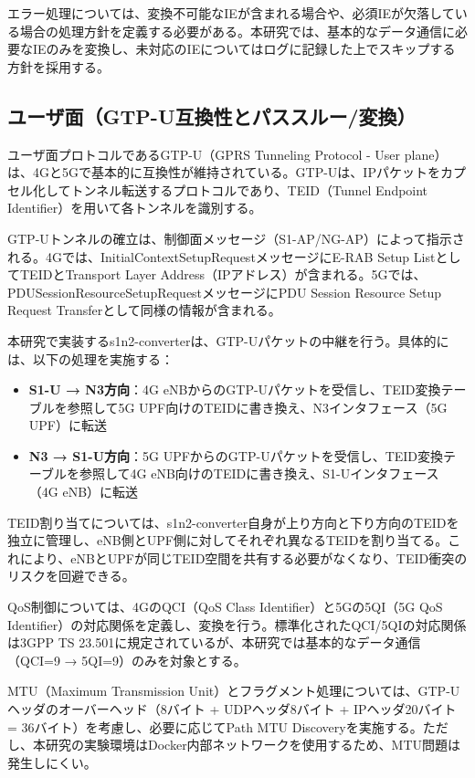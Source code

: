 エラー処理については、変換不可能なIEが含まれる場合や、必須IEが欠落している場合の処理方針を定義する必要がある。本研究では、基本的なデータ通信に必要なIEのみを変換し、未対応のIEについてはログに記録した上でスキップする方針を採用する。

\subsection{ユーザ面（GTP-U互換性とパススルー/変換）}

ユーザ面プロトコルであるGTP-U（GPRS Tunneling Protocol - User plane）は、4Gと5Gで基本的に互換性が維持されている。GTP-Uは、IPパケットをカプセル化してトンネル転送するプロトコルであり、TEID（Tunnel Endpoint Identifier）を用いて各トンネルを識別する。

GTP-Uトンネルの確立は、制御面メッセージ（S1-AP/NG-AP）によって指示される。4Gでは、InitialContextSetupRequestメッセージにE-RAB Setup ListとしてTEIDとTransport Layer Address（IPアドレス）が含まれる。5Gでは、PDUSessionResourceSetupRequestメッセージにPDU Session Resource Setup Request Transferとして同様の情報が含まれる。

本研究で実装するs1n2-converterは、GTP-Uパケットの中継を行う。具体的には、以下の処理を実施する：

\begin{itemize}
\item \textbf{S1-U → N3方向}：4G eNBからのGTP-Uパケットを受信し、TEID変換テーブルを参照して5G UPF向けのTEIDに書き換え、N3インタフェース（5G UPF）に転送
\item \textbf{N3 → S1-U方向}：5G UPFからのGTP-Uパケットを受信し、TEID変換テーブルを参照して4G eNB向けのTEIDに書き換え、S1-Uインタフェース（4G eNB）に転送
\end{itemize}

TEID割り当てについては、s1n2-converter自身が上り方向と下り方向のTEIDを独立に管理し、eNB側とUPF側に対してそれぞれ異なるTEIDを割り当てる。これにより、eNBとUPFが同じTEID空間を共有する必要がなくなり、TEID衝突のリスクを回避できる。

QoS制御については、4GのQCI（QoS Class Identifier）と5Gの5QI（5G QoS Identifier）の対応関係を定義し、変換を行う。標準化されたQCI/5QIの対応関係は3GPP TS 23.501に規定されているが、本研究では基本的なデータ通信（QCI=9 → 5QI=9）のみを対象とする。

MTU（Maximum Transmission Unit）とフラグメント処理については、GTP-Uヘッダのオーバーヘッド（8バイト + UDPヘッダ8バイト + IPヘッダ20バイト = 36バイト）を考慮し、必要に応じてPath MTU Discoveryを実施する。ただし、本研究の実験環境はDocker内部ネットワークを使用するため、MTU問題は発生しにくい。

